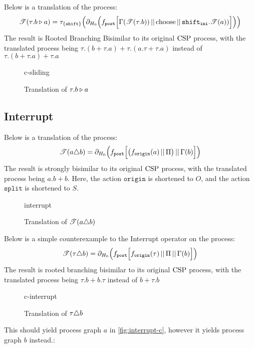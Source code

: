 \documentclass[../hons_project.tex]{subfiles}
\begin{document}
Below is a translation of the process:
\[\mathscr{T}(\tau.b \triangleright a)= \tau_{\{\mathtt{shift}\}}\Bigl(\partial_{H_{0}}\Bigl(f_{\mathtt{post}}\Bigl[ \Gamma(\mathscr{T}(\tau.b)) \,\vert\vert\, \mathrm{choose} \,\vert\vert\, \mathtt{shift}_{\mathtt{ini}} . \mathscr{T}(a)) \Bigr]\Bigr)\Bigr)\]
The result is Rooted Branching Bisimilar to its original $\mathrm{CSP}$ process, with the translated process being $\tau.(b+\tau.a) + \tau.(a.\tau+\tau.a)$ instead of $\tau.(b+\tau.a) + \tau.a$

\begin{figure}[H]
	{c-sliding}
	\caption{Translation of $\tau.b \triangleright a$}
\end{figure}


\subsection{Interrupt}\label{ssec:diagrams-interrupt}
Below is a translation of the process:
\[\mathscr{T}(a \triangle b) = \partial_{H_{0}}\Bigl(f_{\mathtt{post}}\Bigl[ \bigl(f_{\mathtt{origin}}(a) \,\vert\vert\, \Pi\bigr) \,\vert\vert\, \Gamma(b) \Bigr]\Bigr)\]
The result is strongly bisimilar to its original $\mathrm{CSP}$ process, with the translated process being $a.b + b$. Here, the action $\mathtt{origin}$ is shortened to $O$, and the action $\mathtt{split}$ is shortened to $S$.

\begin{figure}[H]
	{interrupt}
	\caption{Translation of $\mathscr{T}(a \triangle b)$}\end{figure}

Below is a simple counterexample to the Interrupt operator on the process:
\[\mathscr{T}(\tau \triangle b) = \partial_{H_{0}}\Bigl(f_{\mathtt{post}}\Bigl[ f_{\mathtt{origin}}(\tau) \,\vert\vert\, \Pi \,\vert\vert\, \Gamma(b) \Bigr]\Bigr)\]
The result is rooted branching bisimilar to its original $\mathrm{CSP}$ process, with the translated process being $\tau.b + b.\tau$ instead of $b + \tau.b$
\begin{figure}[H]
	\centering
	{c-interrupt}
	\caption{Translation of $\tau \triangle b$}
\end{figure}

\newpage
This should yield process graph $a$ in \cref{fig:interrupt-c}, however it yields process graph $b$ instead.:
\begin{multicols}{2}

\end{multicols}
\end{document}
